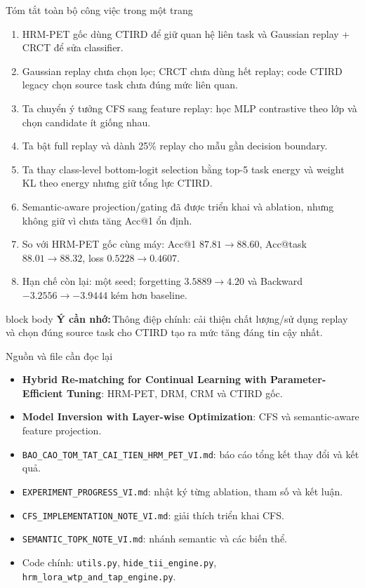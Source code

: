 \documentclass[aspectratio=169,10pt]{beamer}
\newcommand{\remember}[1]{%
  \par\vspace{0.12cm}%
  \begin{beamercolorbox}[wd=\linewidth,sep=0.11cm,leftskip=0.08cm,rightskip=0.08cm,rounded=true]{block body}
    \footnotesize\textbf{\color{HRMBlue}Ý cần nhớ:}\,\color{HRMDark}#1
  \end{beamercolorbox}
}
\begin{document}
\begin{frame}{Tóm tắt toàn bộ công việc trong một trang}
  \small
  \begin{enumerate}\setlength\itemsep{0.22cm}
    \item HRM-PET gốc dùng CTIRD để giữ quan hệ liên task và Gaussian replay + CRCT để sửa classifier.
    \item Gaussian replay chưa chọn lọc; CRCT chưa dùng hết replay; code CTIRD legacy chọn source task chưa đúng mức liên quan.
    \item Ta chuyển ý tưởng CFS sang feature replay: học MLP contrastive theo lớp và chọn candidate ít giống nhau.
    \item Ta bật full replay và dành 25\% replay cho mẫu gần decision boundary.
    \item Ta thay class-level bottom-logit selection bằng top-5 task energy và weight KL theo energy nhưng giữ tổng lực CTIRD.
    \item Semantic-aware projection/gating đã được triển khai và ablation, nhưng không giữ vì chưa tăng Acc@1 ổn định.
    \item So với HRM-PET gốc cùng máy: Acc@1 $87.81\rightarrow88.60$, Acc@task $88.01\rightarrow88.32$, loss $0.5228\rightarrow0.4607$.
    \item Hạn chế còn lại: một seed; forgetting $3.5889\rightarrow4.20$ và Backward $-3.2556\rightarrow-3.9444$ kém hơn baseline.
  \end{enumerate}
  \remember{Thông điệp chính: cải thiện chất lượng/sử dụng replay và chọn đúng source task cho CTIRD tạo ra mức tăng đáng tin cậy nhất.}
\end{frame}

\appendix
\begin{frame}{Nguồn và file cần đọc lại}
  \small
  \begin{itemize}\setlength\itemsep{0.28cm}
    \item \textbf{Hybrid Re-matching for Continual Learning with Parameter-Efficient Tuning}: HRM-PET, DRM, CRM và CTIRD gốc.
    \item \textbf{Model Inversion with Layer-wise Optimization}: CFS và semantic-aware feature projection.
    \item \texttt{BAO\_CAO\_TOM\_TAT\_CAI\_TIEN\_HRM\_PET\_VI.md}: báo cáo tổng kết thay đổi và kết quả.
    \item \texttt{EXPERIMENT\_PROGRESS\_VI.md}: nhật ký từng ablation, tham số và kết luận.
    \item \texttt{CFS\_IMPLEMENTATION\_NOTE\_VI.md}: giải thích triển khai CFS.
    \item \texttt{SEMANTIC\_TOPK\_NOTE\_VI.md}: nhánh semantic và các biến thể.
    \item Code chính: \texttt{utils.py}, \texttt{hide\_tii\_engine.py}, \texttt{hrm\_lora\_wtp\_and\_tap\_engine.py}.
  \end{itemize}
\end{frame}
\end{document}
